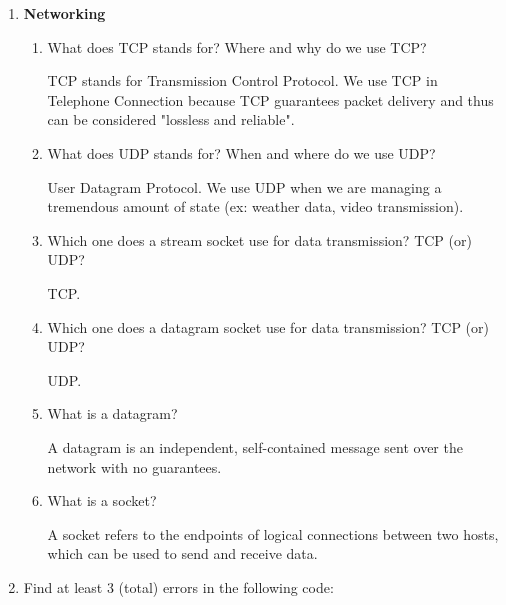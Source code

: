 \documentclass[11pt]{article}
\newenvironment{answer}{\large\lstset{basicstyle=\tiny\ttfamily}\color{white}}{}
\newenvironment{answer}{\large\lstset{basicstyle=\large\ttfamily}\color{red}}{}
\begin{document}
\begin{enumerate}
\item \textbf{Networking} 
	\begin{enumerate}
		\item What does TCP stands for? Where and why do we use TCP?
		
		\begin{answer}
		TCP stands for Transmission Control Protocol. We use TCP in Telephone Connection because TCP guarantees packet delivery and thus can be considered "lossless and reliable".
		\end{answer}
		
		\item What does UDP stands for? When and where do we use UDP?
		
		\begin{answer}
		User Datagram Protocol. We use UDP when we are managing a tremendous amount of state (ex: weather data, video transmission).
		\end{answer}
		
		\item Which one does a stream socket use for data transmission? TCP (or) UDP?
		
		\begin{answer}
		TCP. 
		\end{answer}
		
		\item Which one does a datagram socket use for data transmission? TCP (or) UDP?
		
		\begin{answer}
		UDP.
		\end{answer}
		
		\item What is a datagram?
		
		\begin{answer}
		A datagram is an independent, self-contained message sent over the network with no guarantees. %
		\end{answer}
		
		\item What is a socket?
		
		\begin{answer}
		A socket refers to the endpoints of logical connections between two hosts, which can be used to send and receive data.
		\end{answer}
	
	\end{enumerate}


\newpage
\item
	Find at least 3 (total) errors in the following code:


\end{enumerate}
\end{document}
